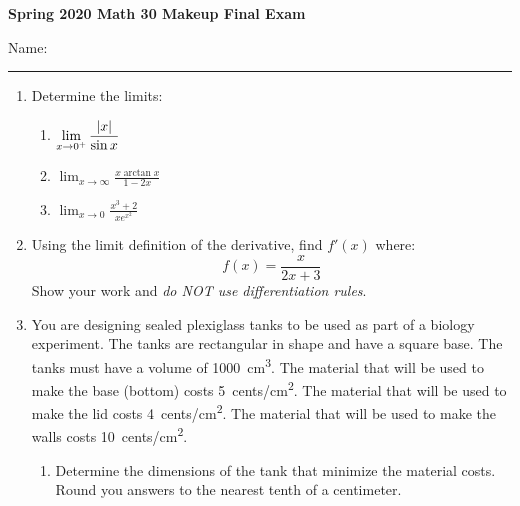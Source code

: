 \documentclass[letterpaper,12pt,fleqn]{article}
\DeclarePairedDelimiter{\abs}{\lvert}{\rvert}
\begin{document}
   

\begin{center}
  \large
  \textbf{Spring 2020 Math 30 Makeup Final Exam}
\end{center}

\vspace{0.5in}

Name: \rule{4in}{1pt}

\vspace{0.5in}

\begin{enumerate}[left=0in]
\item Determine the limits:

  \vspace{0.5in}

  \begin{enumerate}
  \item \(\displaystyle\lim_{x\to0^+}\frac{\abs{x}}{\sin x}\)

    \vspace{1in}

  \item \(\displaystyle \lim_{x\to\infty}\frac{x\arctan x}{1-2x}\)

    \vspace{1in}

  \item \(\displaystyle \lim_{x\to0}\frac{x^3+2}{xe^{x^2}}\)
  \end{enumerate}

  \newpage

\item Using the limit definition of the derivative, find \(f'(x)\) where:
  \[f(x)=\frac{x}{2x+3}\]
  Show your work and \emph{do NOT use differentiation rules}.

  \newpage

\item You are designing sealed plexiglass tanks to be used as part of a biology experiment.  The tanks are
  rectangular in shape and have a square base.  The tanks must have a volume of \SI{1000}{cm^3}.  The material
  that will be used to make the base (bottom) costs \SI{5}{cents/cm^2}.  The material that will be used to make
  the lid costs \SI{4}{cents/cm^2}.  The material that will be used to make the walls costs \SI{10}{cents/cm^2}.

  \bigskip

  \begin{enumerate}
  \item Determine the dimensions of the tank that minimize the material costs.  Round you answers to the nearest
    tenth of a centimeter.


\end{enumerate}
\end{enumerate}
\end{document}
